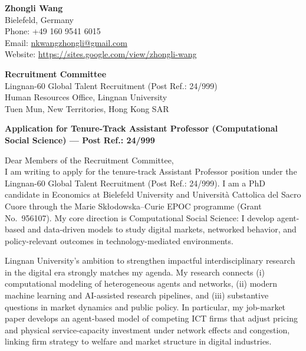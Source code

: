\documentclass[11pt]{article}
\begin{document}
\noindent
\textbf{Zhongli Wang} \\
Bielefeld, Germany \\
Phone: +49 160 9541 6015 \\
Email: \href{mailto:nkwangzhongli@gmail.com}{nkwangzhongli@gmail.com} \\
Website: \href{https://sites.google.com/view/zhongli-wang}{https://sites.google.com/view/zhongli-wang}

\vspace{0.45cm}

\noindent
\textbf{Recruitment Committee} \\
Lingnan-60 Global Talent Recruitment (Post Ref.: 24/999) \\
Human Resources Office, Lingnan University \\
Tuen Mun, New Territories, Hong Kong SAR

\vspace{0.45cm}

\noindent
\textbf{Application for Tenure-Track Assistant Professor (Computational Social Science) --- Post Ref.: 24/999}

\vspace{0.25cm}

\noindent Dear Members of the Recruitment Committee,\\[0.2cm]

I am writing to apply for the tenure-track Assistant Professor position under the Lingnan-60 Global Talent Recruitment (Post Ref.: 24/999). I am a PhD candidate in Economics at Bielefeld University and Universit\`a Cattolica del Sacro Cuore through the Marie Sk\l odowska--Curie EPOC programme (Grant No.\ 956107). My core direction is Computational Social Science: I develop agent-based and data-driven models to study digital markets, networked behavior, and policy-relevant outcomes in technology-mediated environments.

Lingnan University’s ambition to strengthen impactful interdisciplinary research in the digital era strongly matches my agenda. My research connects (i) computational modeling of heterogeneous agents and networks, (ii) modern machine learning and AI-assisted research pipelines, and (iii) substantive questions in market dynamics and public policy. In particular, my job-market paper develops an agent-based model of competing ICT firms that adjust pricing and physical service-capacity investment under network effects and congestion, linking firm strategy to welfare and market structure in digital industries.
\end{document}
